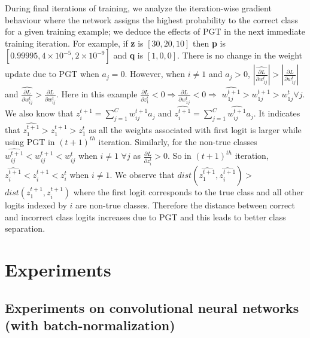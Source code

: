 \documentclass[times,sort&compress]{elsarticle}
\begin{document}
During final iterations of training, we analyze the iteration-wise gradient behaviour
where the network assigns the highest probability to the correct class for a given
training example; we deduce the effects of PGT in the next immediate training iteration.
For example, if \textbf{z} is $[30, 20, 10]$ then \textbf{p} is $[0.99995, 4\times
10^{-5}, 2\times10^{-9}]$ and \textbf{q} is $[1, 0, 0]$. There is no change in the
weight update due to PGT when $a_j = 0$. However, when $i \neq 1$ and $a_j > 0$,
$|\widehat{\frac{\partial L}{\partial w_{1j}^{t}}}| > |\frac{\partial L}{\partial
w_{1j}^{t}}|$ and $\widehat{\frac{\partial L}{\partial w_{ij}^{t}}} > \frac{\partial
L}{\partial w_{ij}^{t}}$. Here in this example $\frac{\partial L}{\partial z_{1}^{t}} <
0 \Rightarrow \frac{\partial L}{\partial w_{1j}^{t}} < 0 \Rightarrow$
$\widehat{w_{1j}^{t+1}} > w_{1j}^{t+1} > w_{1j}^{t} \forall j$. We also know that
$z_i^{t+1} = \sum_{j=1}^{C}w_{ij}^{t+1}a_j$ and $\widehat{z_i^{t+1}} =
\sum_{j=1}^{C}\widehat{w_{ij}^{t+1}}a_j$. It indicates that $\widehat{z_{1}^{t+1}} >
z_{1}^{t+1} > z_{1}^{t}$ as all the weights associated with first logit is larger while
using PGT in $(t+1)^{th}$ iteration. Similarly, for the non-true classes
$\widehat{w_{ij}^{t+1}} < w_{ij}^{t+1} < w_{ij}^{t}$ when $i \neq 1$ $\forall j$ as
$\frac{\partial L}{\partial z_{i}^{t}} > 0$. So in $(t+1)^{th}$ iteration,
$\widehat{z_{i}^{t+1}} < z_{i}^{t+1} < z_{i}^{t}$ when $i \neq 1$. We observe that
$dist(\widehat{z_{1}^{t+1}}, \widehat{z_{i}^{t+1}}) > $  $dist(z_{1}^{t+1},
z_{i}^{t+1})$ where the first logit corresponds to the true class and all other logits
indexed by $i$ are non-true classes. Therefore the distance between correct and
incorrect class logits increases due to PGT and this leads to better class separation.


\section{Experiments}
\label{sec:Expe}






\subsection{Experiments on convolutional neural networks (with batch-normalization)}
\label{sec:bn}
\end{document}
